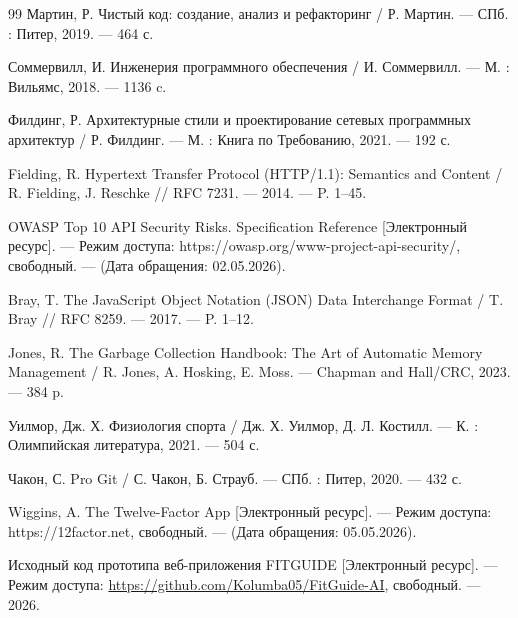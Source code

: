 \documentclass[14pt, a4paper]{extarticle}
\begin{document}
\begin{thebibliography}{99}
Мартин, Р. Чистый код: создание, анализ и рефакторинг / Р. Мартин. --- СПб. : Питер, 2019. --- 464 с.

Соммервилл, И. Инженерия программного обеспечения / И. Соммервилл. --- М. : Вильямс, 2018. --- 1136 c.

Филдинг, Р. Архитектурные стили и проектирование сетевых программных архитектур / Р. Филдинг. --- М. : Книга по Требованию, 2021. --- 192 с.

Fielding, R. Hypertext Transfer Protocol (HTTP/1.1): Semantics and Content / R. Fielding, J. Reschke // RFC 7231. --- 2014. --- P. 1--45.

OWASP Top 10 API Security Risks. Specification Reference [Электронный ресурс]. --- Режим доступа: https://owasp.org/www-project-api-security/, свободный. --- (Дата обращения: 02.05.2026).

Bray, T. The JavaScript Object Notation (JSON) Data Interchange Format / T. Bray // RFC 8259. --- 2017. --- P. 1--12.

Jones, R. The Garbage Collection Handbook: The Art of Automatic Memory Management / R. Jones, A. Hosking, E. Moss. --- Chapman and Hall/CRC, 2023. --- 384 p.

Уилмор, Дж. Х. Физиология спорта / Дж. Х. Уилмор, Д. Л. Костилл. --- К. : Олимпийская литература, 2021. --- 504 с.

Чакон, С. Pro Git / С. Чакон, Б. Страуб. --- СПб. : Питер, 2020. --- 432 с.

Wiggins, A. The Twelve-Factor App [Электронный ресурс]. --- Режим доступа: https://12factor.net, свободный. --- (Дата обращения: 05.05.2026).

Исходный код прототипа веб-приложения FITGUIDE [Электронный ресурс]. --- Режим доступа: \url{https://github.com/Kolumba05/FitGuide-AI}, свободный. --- 2026.

\end{thebibliography}
\end{document}
